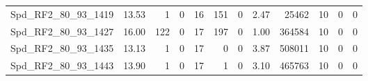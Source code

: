\begin{longtable}[c]{@{}lrrrrrrrrrrr@{}}
Spd\_RF2\_80\_93\_1419       & 13.53                  & 1                       & 0                       & 16                     & 151                     & 0                       & 2.47                    & 25462                    & 10                       & 0                        & 0                        \\
Spd\_RF2\_80\_93\_1427       & 16.00                  & 122                     & 0                       & 17                     & 197                     & 0                       & 1.00                    & 364584                   & 10                       & 0                        & 0                        \\
Spd\_RF2\_80\_93\_1435       & 13.13                  & 1                       & 0                       & 17                     & 0                       & 0                       & 3.87                    & 508011                   & 10                       & 0                        & 0                        \\
Spd\_RF2\_80\_93\_1443       & 13.90                  & 1                       & 0                       & 17                     & 1                       & 0                       & 3.10                    & 465763                   & 10                       & 0                        & 0                        \\* \bottomrule
\end{longtable}